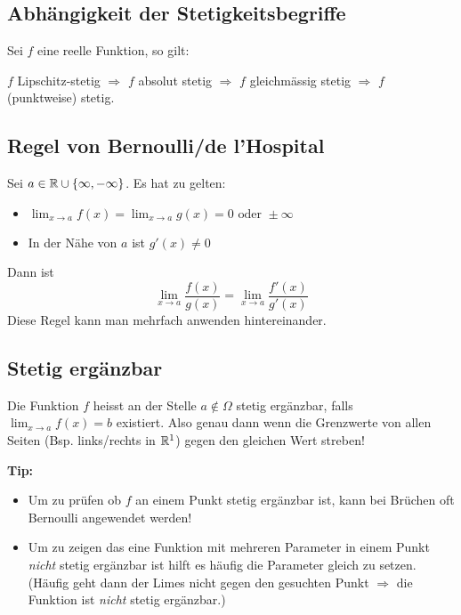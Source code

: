 \subsection{Abhängigkeit der Stetigkeitsbegriffe}
Sei $f$ eine reelle Funktion, so gilt:

$f$ Lipschitz-stetig $\Rightarrow$ $f$ absolut stetig $\Rightarrow$ $f$
gleichmässig stetig $\Rightarrow$ $f$ (punktweise) stetig.

\subsection{Regel von Bernoulli/de l'Hospital}
Sei $a \in \mathbb{R} \cup \{\infty, -\infty\}$. Es hat zu gelten:
\begin{itemize}
  \item $\lim_{x \to a} f(x) = \lim_{x \to a} g(x) = 0 \text{ oder } \pm\infty$
  \item In der Nähe von $a$ ist $g'(x) \neq 0$
\end{itemize}
Dann ist
\[
\lim_{x \to a} \frac{f(x)}{g(x)} = \lim_{x \to a}
\frac{f'(x)}{g'(x)}
\]
Diese Regel kann man mehrfach anwenden hintereinander.


\subsection{Stetig ergänzbar}
Die Funktion $f$ heisst an der Stelle $a \notin \Omega$ stetig ergänzbar, falls $\lim_{x \to a} f(x) = b$ existiert. Also genau dann wenn die Grenzwerte von allen Seiten (Bsp. links/rechts in $\mathbb{R}^1$) gegen den gleichen Wert streben! 

\textbf{Tip:}
\begin{itemize}
	\item Um zu prüfen ob $f$ an einem Punkt stetig ergänzbar ist, kann bei Brüchen oft Bernoulli angewendet werden!
  	\item Um zu zeigen das eine Funktion mit mehreren Parameter in einem Punkt \emph{nicht} stetig ergänzbar ist
	hilft es häufig die Parameter gleich zu setzen. (Häufig geht dann der Limes nicht gegen den gesuchten Punkt
	 $\Rightarrow$ die Funktion ist \emph{nicht} stetig ergänzbar.)
\end{itemize}
